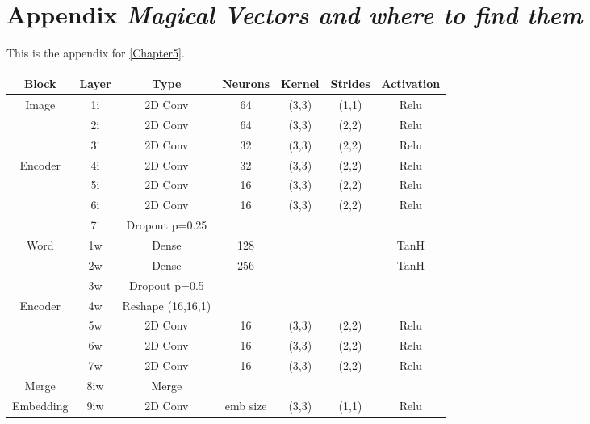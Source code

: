 \chapter{Appendix \emph{Magical Vectors and where to find them}}
\label{appendix:B}

This is the appendix for \autoref{Chapter5}.

\begin{table}
		\centering
		\begin{tabular}{|c|c|c|c|c|c|c|}
			\hline
			Block & Layer & Type & Neurons & Kernel & Strides & Activation \\ \hline
			\multirow{3}{*}{Image} & 1i	&	2D Conv & 64 & (3,3) & (1,1) & Relu \\ \cline{2-7}
			& 2i	&	2D Conv & 64 & (3,3) & (2,2) & Relu \\ \cline{2-7}
			& 3i	&	2D Conv & 32 & (3,3) & (2,2) & Relu \\ \cline{2-7}
\multirow{3}{*}{Encoder} & 4i	&	2D Conv & 32 & (3,3) & (2,2) & Relu \\ \cline{2-7}
			& 5i	&	2D Conv & 16 & (3,3) & (2,2) & Relu \\ \cline{2-7}
			& 6i	&	2D Conv & 16 & (3,3) & (2,2) & Relu \\ \cline{2-7}
			& 7i	&	Dropout p=0.25 &	 & 	     &       &  \\ \hline

			\multirow{3}{*}{Word} & 1w	& Dense & 128 & & &TanH \\ \cline{2-7}
			& 2w	& Dense & 256 & & &TanH \\ \cline{2-7}
			& 3w 	&	Dropout p=0.5 &	 & 	     &       & \\ \cline{2-7}
\multirow{4}{*}{Encoder}& 4w  &	Reshape (16,16,1) & & & & \\ \cline{2-7}
			& 5w	&	2D Conv & 16 & (3,3) & (2,2) & Relu \\ \cline{2-7}
			& 6w	&	2D Conv & 16 & (3,3) & (2,2) & Relu \\ \cline{2-7}
			& 7w	&	2D Conv & 16 & (3,3) & (2,2) & Relu \\ \hline

			Merge & 8iw	& Merge & & & & \\ \hline
Embedding & 9iw	&	2D Conv  & emb size & (3,3) & (1,1) & Relu \\ \hline
			

\end{tabular}
\end{table}
